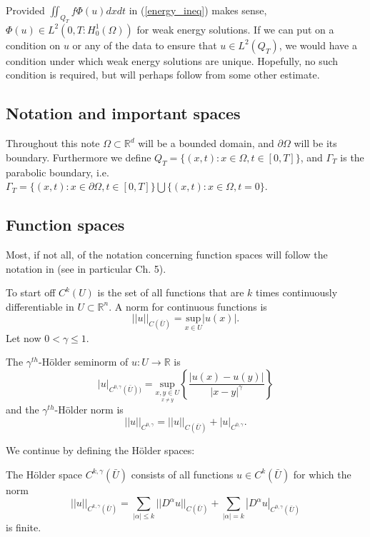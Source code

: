 \documentclass[11pt, a4paper]{article}
\begin{document}
\setcounter{obs}{0}
\begin{obs}
Provided $\iint_{Q_T} f\Phi(u)dxdt$ in (\ref{energy_ineq}) makes sense, $\Phi(u) \in L^2(0,T: H_0^1(\Omega))$ for weak energy solutions. If we can put on a condition on $u$ or any of the data to ensure that $u \in L^2(Q_T)$, we would have a condition under which weak energy solutions are unique. Hopefully, no such condition is required, but will perhaps follow from some other estimate.
\end{obs}
\begin{appendices}
\section{Notation and important spaces}
Throughout this note $\Omega \subset \mathbb{R}^d$ will be a bounded domain, and $\partial \Omega$ will be its boundary. Furthermore we define $Q_T = \{ (x,t): x \in \Omega, t\in [0,T] \}$, and $\Gamma_T$ is the parabolic boundary, i.e. $\Gamma_T = \{(x,t): x \in \partial \Omega, t \in [0,T]\} \bigcup \{(x,t): x \in \Omega, t=0\}$.

\subsection{Function spaces}
Most, if not all, of the notation concerning function spaces will follow the notation in \citep{evans} (see in particular Ch. 5).

To start off $C^k(U)$ is the set of all functions that are $k$ times continuously differentiable in $U \subset \mathbb{R}^n$. A norm for continuous functions is
\begin{equation*}
	||u||_{C(\bar{U})} = \underset{x\in U}{\text{sup}}|u(x)|.
\end{equation*}
Let now $0 < \gamma \leq 1$.
\begin{mydef}
The $\gamma^{th}$-Hölder seminorm of $u: U \to \mathbb{R}$ is
	\begin{equation*}
	|u|_{C^{0,\gamma}(\bar{U}))} = \underset{\underset{x \neq y}{x,y \in U}}{\text{sup}} \left\{\frac{|u(x)-u(y)|}{|x-y|^\gamma} \right\}
	\end{equation*}
and the $\gamma^{th}$-Hölder norm is
\begin{equation*}
||u||_{C^{0,\gamma}} = ||u||_{C(\bar{U})} + |u|_{C^{0,\gamma}}.
\end{equation*}
\end{mydef}
We continue by defining the Hölder spaces:
\begin{mydef}
The Hölder space $C^{k,\gamma}(\bar{U})$ consists of all functions $u \in C^k(\bar{U})$ for which the norm
\begin{equation*}
 ||u||_{C^{k,\gamma}(\bar{U})} = \sum_{|\alpha| \leq k}||D^\alpha u||_{C(\bar{U})} + \sum_{|\alpha| = k} |D^\alpha u|_{C^{0,\gamma}(\bar{U})}
\end{equation*}
is finite.
\end{mydef}

\end{appendices}
\end{document}
